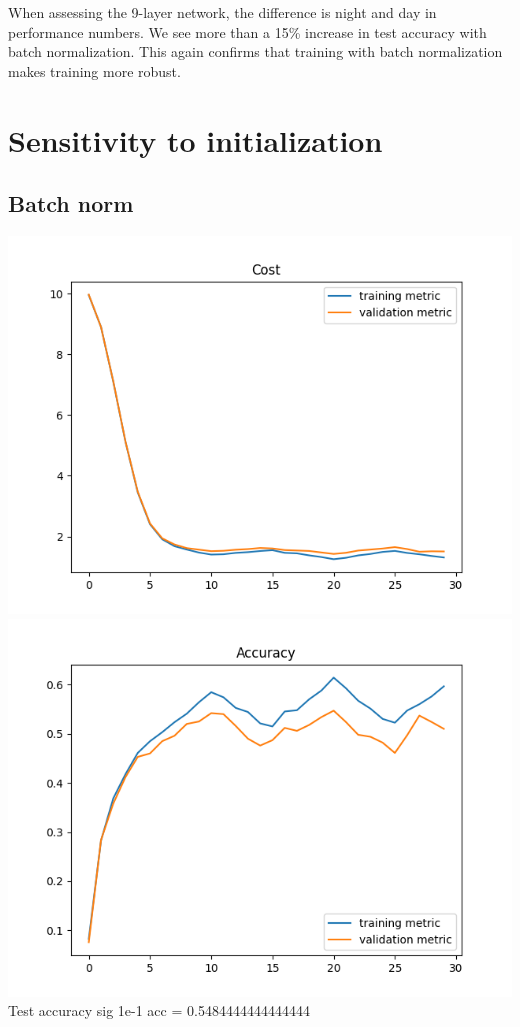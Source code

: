 \documentclass[11pt,a4paper]{article}
\begin{document}
When assessing the 9-layer network, the difference is night and day in performance numbers. We see more than a 15\% increase in test accuracy with batch normalization. This again confirms that training with batch normalization makes training more robust.

\section{Sensitivity to initialization}

\subsection{Batch norm}

\includegraphics[width=\textwidth]{batch_norm_sig=1e-1_cost-.png}
\includegraphics[width=\textwidth]{batch_norm_sig=1e-1_accuracy-.png}
Test accuracy sig 1e-1 acc = 0.5484444444444444\\
\end{document}
